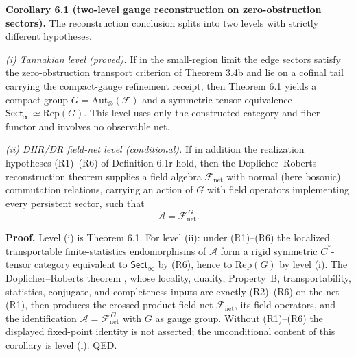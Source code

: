 \textbf{Corollary 6.1 (two-level gauge reconstruction on zero-obstruction sectors).} The reconstruction conclusion splits into two levels with strictly different hypotheses.

\emph{(i) Tannakian level (proved).} If in the small-region limit the edge sectors satisfy the zero-obstruction transport criterion of Theorem 3.4b and lie on a cofinal tail carrying the compact-gauge refinement receipt, then Theorem 6.1 yields a compact group \(G=\mathrm{Aut}_\otimes(\mathcal F)\) and a symmetric tensor equivalence \(\mathsf{Sect}_\infty\simeq\mathrm{Rep}(G)\). This level uses only the constructed category and fiber functor and involves no observable net.

\emph{(ii) DHR/DR field-net level (conditional).} If in addition the realization hypotheses (R1)--(R6) of Definition 6.1r hold, then the Doplicher--Roberts reconstruction theorem \cite{dr89,dr90} supplies a field algebra \(\mathcal F_{\mathrm{net}}\) with normal (here bosonic) commutation relations, carrying an action of \(G\) with field operators implementing every persistent sector, such that
\[
\mathcal A=\mathcal F_{\mathrm{net}}^{\,G}.
\]

\textbf{Proof.} Level (i) is Theorem 6.1. For level (ii): under (R1)--(R6) the localized transportable finite-statistics endomorphisms of \(\mathcal A\) form a rigid symmetric \(C^*\)-tensor category equivalent to \(\mathsf{Sect}_\infty\) by (R6), hence to \(\mathrm{Rep}(G)\) by level (i). The Doplicher--Roberts theorem \cite{dr89,dr90}, whose locality, duality, Property~B, transportability, statistics, conjugate, and completeness inputs are exactly (R2)--(R6) on the net (R1), then produces the crossed-product field net \(\mathcal F_{\mathrm{net}}\), its field operators, and the identification \(\mathcal A=\mathcal F_{\mathrm{net}}^{\,G}\) with \(G\) as gauge group. Without (R1)--(R6) the displayed fixed-point identity is not asserted; the unconditional content of this corollary is level (i). QED.

